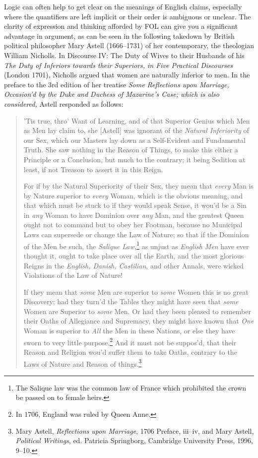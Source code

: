 Logic can often help to get clear on the meanings of English claims,
especially where the quantifiers are left implicit or their order is
ambiguous or unclear. The clarity of expression and thinking afforded
by FOL can give you a significant advantage in argument, as can be
seen in the following takedown by British political philosopher Mary
Astell (1666--1731) of her contemporary, the theologian William
Nicholls. In Discourse IV: The Duty of Wives to their Husbands of his
\textit{The Duty of Inferiors towards their Superiors, in Five
  Practical Discourses} (London 1701), Nicholls argued that women are
naturally inferior to men. In the preface to the 3rd edition of her
treatise \emph{Some Reflections upon Marriage, Occasion'd by the Duke
  and Duchess of Mazarine's Case; which is also considered,} Astell
responded as follows:
\begin{quotation}
'Tis true, thro' Want of Learning, and of that Superior Genius which
Men as Men lay claim to, she [Astell] was ignorant of the
\textit{Natural Inferiority} of our Sex, which our Masters lay down as
a Self-Evident and Fundamental Truth. She saw nothing in the Reason of
Things, to make this either a Principle or a Conclusion, but much to
the contrary; it being Sedition at least, if not Treason to assert it
in this Reign. 

For if by the Natural Superiority of their Sex, they mean that
\textit{every} Man is by Nature superior to \textit{every} Woman,
which is the obvious meaning, and that which must be stuck to if they
would speak Sense, it wou'd be a Sin in \textit{any} Woman to have
Dominion over \textit{any} Man, and the greatest Queen ought not to
command but to obey her Footman, because no Municipal Laws can
supersede or change the Law of Nature; so that if the Dominion of the
Men be such, the \textit{Salique Law,}\footnote{The Salique law was
  the common law of France which prohibited the crown be passed on to
  female heirs.} as unjust as \textit{English Men} have ever thought
it, ought to take place over all the Earth, and the most glorious
Reigns in the \textit{English, Danish, Castilian}, and other Annals,
were wicked Violations of the Law of Nature!

If they mean that \textit{some} Men are superior to \textit{some}
Women this is no great Discovery; had they turn'd the Tables they
might have seen that \textit{some} Women are Superior to \textit{some}
Men. Or had they been pleased to remember their Oaths of Allegiance
and Supremacy, they might have known that \textit{One} Woman is
superior to \textit{All} the Men in these Nations, or else they have
sworn to very little purpose.\footnote{In 1706, England was ruled by
  Queen Anne.} And it must not be suppos'd, that their Reason and
Religion wou'd suffer them to take Oaths, contrary to the Laws of
Nature and Reason of things.\footnote{Mary Astell, \textit{Reflections
    upon Marriage}, 1706 Preface, iii--iv, and Mary Astell,
  \textit{Political Writings}, ed. Patricia Springborg, Cambridge
  University Press, 1996, 9--10.}
\end{quotation}
